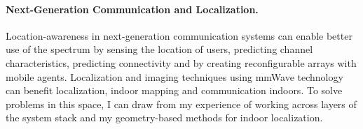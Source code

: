 \documentclass[10pt]{article}
\begin{document}
\paragraph{Next-Generation Communication and Localization. }
Location-awareness in next-generation communication systems can enable better use of the
spectrum by sensing the location of users, predicting channel characteristics, predicting connectivity and by creating reconfigurable arrays with mobile agents. 
Localization and imaging techniques using mmWave technology can benefit localization, indoor mapping and communication indoors.  %
To solve problems in this space, I can draw from my experience of working across layers of the system stack and my geometry-based methods for indoor localization. \\
\end{document}
